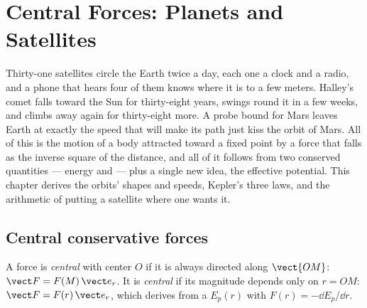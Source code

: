 \chapter{Central Forces: Planets and Satellites}\label{ch:b1:central-forces}

Thirty-one satellites circle the Earth twice a day, each one a clock
and a radio, and a phone that hears four of them knows where it is to
a few meters. Halley's comet falls toward the Sun for thirty-eight
years, swings round it in a few weeks, and climbs away again for
thirty-eight more. A probe bound for Mars leaves Earth at exactly the
speed that will make its path just kiss the orbit of Mars. All of this
is the motion of a body attracted toward a fixed point by a force that
falls as the inverse square of the distance, and all of it follows
from two conserved quantities --- energy and  --- plus
a single new idea, the effective potential. This chapter derives the
orbits' shapes and speeds, Kepler's three laws, and the arithmetic of
putting a satellite where one wants it.

\section{Central conservative forces}

\begin{definition}\label{def:b1:central-forces:central}
A force is \emph{central} with center $O$ if it is always directed
along $\vect{OM}$: $\vect F = F(M)\,\vect e_r$. It is \emph{central
} if its magnitude depends only on $r = OM$: $\vect F =
F(r)\,\vect e_r$, which derives from a  $E_p(r)$ with
$F(r) = -\dd E_p/\dd r$.
\end{definition}

